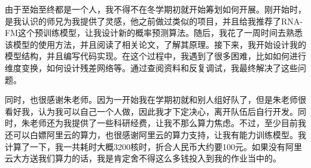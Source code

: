 \documentclass[a4paper,12pt]{article}
\begin{document}
由于至始至终都是一个人，我不得不在冬学期初就开始筹划如何开展。刚开始时，是我认识的师兄为我提供了灵感，他之前做过类似的项目，并且给我推荐了RNA-FM这个预训练模型，让我设计新的概率预测算法。随后，我花了一周时间去熟悉该模型的使用方法，并且阅读了相关论文，了解其原理。接下来，我开始设计我的模型结构，并且编写代码实现。在这个过程中，我遇到了很多困难，比如如何进行维度变换，如何设计残差网络等。通过查阅资料和反复调试，我最终解决了这些问题。

同时，也很感谢朱老师。因为一开始我在学期初就和别人组好队了，但是朱老师很看好我，认为我可以自己一个人做，因此我才下定决心，离开队伍后自行开发。同时，朱老师还为我提供了一些科研经费，让我不那么算力焦虑。不过，至少目前我还可以白嫖阿里云的算力，也很感谢阿里云的算力支持，让我有能力训练模型。我计算了一下，我一共耗时大概3200核时，折合人民币大约要100元。如果没有阿里云大方送我们算力的话，我是肯定舍不得这么多钱投入到我的作业当中的。
\end{document}

